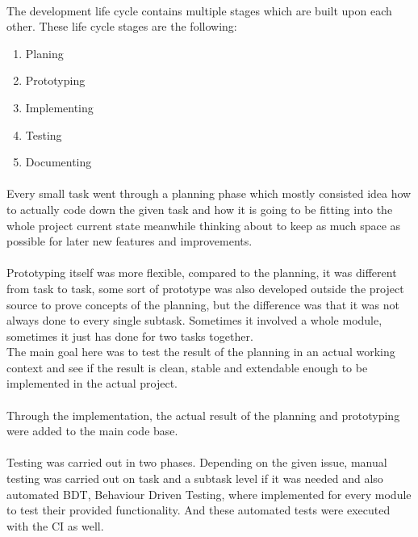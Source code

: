 \documentclass[]{report}
\begin{document}
\paragraph{ }
The development life cycle contains multiple stages which are built upon each other. These life cycle stages are the following:

\begin{enumerate}
	\item Planing
	\item Prototyping
	\item Implementing
	\item Testing
	\item Documenting
\end{enumerate}

\paragraph{ }
Every small task went through a planning phase which mostly consisted idea how to actually code down the given task and how it is going to be fitting into the whole project current state meanwhile thinking about to keep as much space as possible for later new features and improvements.

\paragraph{ }
Prototyping itself was more flexible, compared to the planning, it was different from task to task, some sort of prototype was also developed outside the project source to prove concepts of the planning, but the difference was that it was not always done to every single subtask. Sometimes it involved a whole module, sometimes it just has done for two tasks together.
\\
The main goal here was to test the result of the planning in an actual working context and see if the result is clean, stable and extendable enough to be implemented in the actual project.

\paragraph{ }
Through the implementation, the actual result of the planning and prototyping were added to the main code base.

\paragraph{ }
Testing was carried out in two phases. Depending on the given issue, manual testing was carried out on task and a subtask level if it was needed and also automated BDT, Behaviour Driven Testing, where implemented for every module to test their provided functionality. And these automated tests were executed with the CI as well.
%
\end{document}
